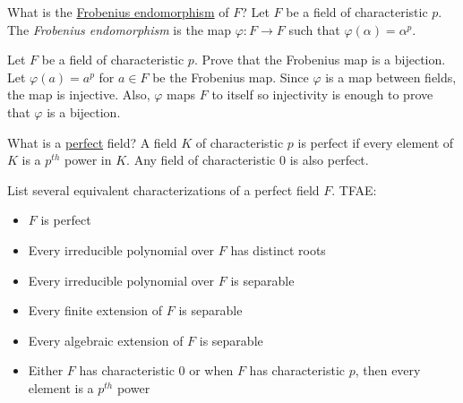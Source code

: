 \documentclass[avery5371,grid]{flashcards}
\let \phi \varphi
\begin{document}
\begin{flashcard}[Fields]{What is the \underline{Frobenius endomorphism} of $F$?}
 Let $F$ be a field of characteristic $p$. The \emph{Frobenius endomorphism} is the map $\phi: F \to F$ such that $\phi(\alpha) = \alpha^p$.
\end{flashcard}

\begin{flashcard}[Fields]{Let $F$ be a field of characteristic $p$. Prove that the Frobenius map is a bijection.}
 Let $\phi(a) = a^p$ for $a \in F$ be the Frobenius map. 
 Since $\phi$ is a map between fields, the map is injective. Also, $\phi$ maps $F$ to itself so injectivity is enough to prove that $\phi$ is a bijection.
\end{flashcard}

\begin{flashcard}[Fields]{What is a \underline{perfect} field?}
 A field $K$ of characteristic $p$ is perfect if every element of $K$ is a $p^{th}$ power in $K$. Any field of characteristic 0 is also perfect.
\end{flashcard}

\begin{flashcard}[Fields]{List several equivalent characterizations of a perfect field $F$.}
 TFAE:
 \begin{itemize}
      \item $F$ is perfect
      \item Every irreducible polynomial over $F$ has distinct roots
      \item Every irreducible polynomial over $F$ is separable
      \item Every finite extension of $F$ is separable
      \item Every algebraic extension of $F$ is separable
      \item Either $F$ has characteristic 0 or when $F$ has characteristic $p$, then every element is a $p^{th}$ power
 \end{itemize}

\end{flashcard}
\end{document}
